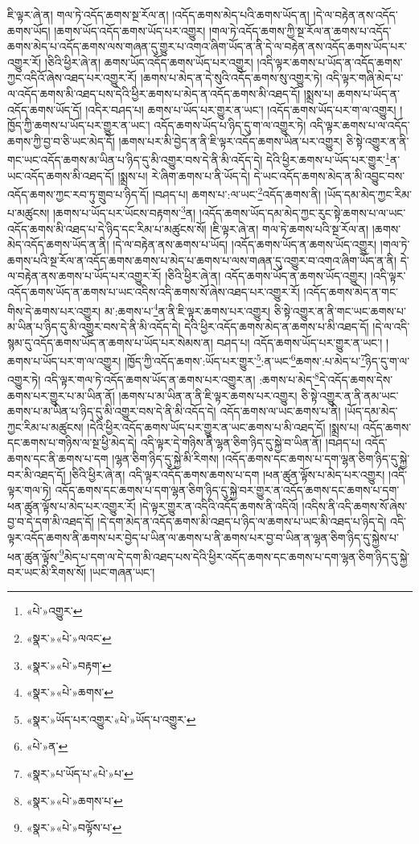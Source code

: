 ཇི་ལྟར་ཞེ་ན། གལ་ཏེ་འདོད་ཆགས་སྔ་རོལ་ན། །འདོད་ཆགས་མེད་པའི་ཆགས་ཡོད་ན། །དེ་ལ་བརྟེན་ནས་འདོད་ཆགས་ཡོད། །ཆགས་ཡོད་འདོད་ཆགས་ཡོད་པར་འགྱུར། །གལ་ཏེ་འདོད་ཆགས་ཀྱི་སྔ་རོལ་ན་ཆགས་པ་འདོད་ཆགས་མེད་པ་འདོད་ཆགས་ལས་གཞན་དུ་གྱུར་པ་འགའ་ཞིག་ཡོད་ན་ནི་དེ་ལ་བརྟེན་ནས་འདོད་ཆགས་ཡོད་པར་འགྱུར་རོ། །ཅིའི་ཕྱིར་ཞེ་ན། ཆགས་ཡོད་འདོད་ཆགས་ཡོད་པར་འགྱུར། །འདི་ལྟར་ཆགས་པ་ཡོད་ན་འདོད་ཆགས་ཀྱང་འདིའོ་ཞེས་འཐད་པར་འགྱུར་རོ། །ཆགས་པ་མེད་ན་དེ་སུའི་འདོད་ཆགས་སུ་འགྱུར་ཏེ། འདི་ལྟར་གཞི་མེད་པ་ལ་འདོད་ཆགས་མི་འཐད་པས་དེའི་ཕྱིར་ཆགས་པ་མེད་ན་འདོད་ཆགས་མི་འཐད་དོ། །སྨྲས་པ། ཆགས་པ་ཡོད་ན་འདོད་ཆགས་ཡོད་དོ། །འདིར་བཤད་པ། ཆགས་པ་ཡོད་པར་གྱུར་ན་ཡང་། །འདོད་ཆགས་ཡོད་པར་ག་ལ་འགྱུར། །ཁྱོད་ཀྱི་ཆགས་པ་ཡོད་པར་གྱུར་ན་ཡང་། འདོད་ཆགས་ཡོད་པ་ཉིད་དུ་ག་ལ་འགྱུར་ཏེ། འདི་ལྟར་ཆགས་པ་ལ་འདོད་ཆགས་ཀྱི་བྱ་བ་ཅི་ཡང་མེད་དོ། །ཆགས་པར་མི་བྱེད་ན་ནི་ཇི་ལྟར་འདོད་ཆགས་ཡིན་པར་འགྱུར། ཅི་སྟེ་འགྱུར་ན་ནི་གང་ཡང་འདོད་ཆགས་མ་ཡིན་པ་ཉིད་དུ་མི་འགྱུར་བས་དེ་ནི་མི་འདོད་དེ། དེའི་ཕྱིར་ཆགས་པ་ཡོད་པར་གྱུར་\footnote{«པེ་»འགྱུར་}ན་ཡང་འདོད་ཆགས་མི་འཐད་དོ། །སྨྲས་པ། རེ་ཞིག་ཆགས་པ་ནི་ཡོད་དེ། དེ་ཡང་འདོད་ཆགས་མེད་ན་མི་འབྱུང་བས་འདོད་ཆགས་ཀྱང་རབ་ཏུ་གྲུབ་པ་ཉིད་དོ། །བཤད་པ། ཆགས་པ་:ལ་ཡང་\footnote{«སྣར་»«པེ་»ལའང་}འདོད་ཆགས་ནི། །ཡོད་དམ་མེད་ཀྱང་རིམ་པ་མཚུངས། །ཆགས་པ་ཡོད་པར་ཡོངས་བརྟགས་\footnote{«སྣར་»«པེ་»བརྟག་}ན། །འདོད་ཆགས་ཡོད་དམ་མེད་ཀྱང་རུང་སྟེ་ཆགས་པ་ལ་ཡང་འདོད་ཆགས་མི་འཐད་པ་དེ་ཉིད་དང་རིམ་པ་མཚུངས་སོ། །ཇི་ལྟར་ཞེ་ན། གལ་ཏེ་ཆགས་པའི་སྔ་རོལ་ན། །ཆགས་མེད་འདོད་ཆགས་ཡོད་ན་ནི། །དེ་ལ་བརྟེན་ནས་ཆགས་པ་ཡོད། །འདོད་ཆགས་ཡོད་ན་ཆགས་ཡོད་འགྱུར། །གལ་ཏེ་ཆགས་པའི་སྔ་རོལ་ན་འདོད་ཆགས་ཆགས་པ་མེད་པ་ཆགས་པ་ལས་གཞན་དུ་འགྱུར་བ་འགའ་ཞིག་ཡོད་ན་ནི། དེ་ལ་བརྟེན་ནས་ཆགས་པ་ཡོད་པར་འགྱུར་རོ། །ཅིའི་ཕྱིར་ཞེ་ན། འདོད་ཆགས་ཡོད་ན་ཆགས་ཡོད་འགྱུར། །འདི་ལྟར་འདོད་ཆགས་ཡོད་ན་ཆགས་པ་ཡང་འདིས་འདི་ཆགས་སོ་ཞེས་འཐད་པར་འགྱུར་རོ། །འདོད་ཆགས་མེད་ན་གང་གིས་དེ་ཆགས་པར་འགྱུར། མ་:ཆགས་པ་\footnote{«སྣར་»«པེ་»ཆགས་}ན་ནི་ཇི་ལྟར་ཆགས་པར་འགྱུར། ཅི་སྟེ་འགྱུར་ན་ནི་གང་ཡང་ཆགས་པ་མ་ཡིན་པ་ཉིད་དུ་མི་འགྱུར་བས་དེ་ནི་མི་འདོད་དེ། དེའི་ཕྱིར་འདོད་ཆགས་མེད་ན་ཆགས་པ་མི་འཐད་དོ། །དེ་ལ་འདི་སྙམ་དུ་འདོད་ཆགས་ཡོད་ན་ཆགས་པ་ཡོད་པར་སེམས་ན། བཤད་པ། འདོད་ཆགས་ཡོད་པར་གྱུར་ན་ཡང་། །ཆགས་པ་ཡོད་པར་ག་ལ་འགྱུར། །ཁྱོད་ཀྱི་འདོད་ཆགས་:ཡོད་པར་གྱུར་\footnote{«སྣར་»ཡོད་པར་འགྱུར་«པེ་»ཡོད་པ་འགྱུར་}:ན་ཡང་\footnote{«པེ་»ན་}ཆགས་:པ་མེད་པ་\footnote{«སྣར་»པ་ཡོད་པ་«པེ་»པ་}ཉིད་དུ་ག་ལ་འགྱུར་ཏེ། འདི་ལྟར་གལ་ཏེ་འདོད་ཆགས་ཡོད་ན་ཆགས་པར་འགྱུར་ན། :ཆགས་པ་མེད་\footnote{«སྣར་»«པེ་»ཆགས་པ་}དེ་འདོད་ཆགས་དེས་ཆགས་པར་གྱུར་པ་མ་ཡིན་ནོ། །ཆགས་པ་མ་ཡིན་ན་ནི་ཇི་ལྟར་ཆགས་པར་འགྱུར། ཅི་སྟེ་འགྱུར་ན་ནི་ནམ་ཡང་ཆགས་པ་མ་ཡིན་པ་ཉིད་དུ་མི་འགྱུར་བས་དེ་ནི་མི་འདོད་དེ། འདོད་ཆགས་ལ་ཡང་ཆགས་པ་ནི། །ཡོད་དམ་མེད་ཀྱང་རིམ་པ་མཚུངས། །དེའི་ཕྱིར་འདོད་ཆགས་ཡོད་པར་གྱུར་ན་ཡང་ཆགས་པ་མི་འཐད་དོ། །སྨྲས་པ། འདོད་ཆགས་དང་ཆགས་པ་གཉིས་ལ་སྔ་ཕྱི་མེད་དེ། འདི་ལྟར་དེ་གཉིས་ནི་ལྷན་ཅིག་ཉིད་དུ་སྐྱེ་བ་ཡིན་ནོ། །བཤད་པ། འདོད་ཆགས་དང་ནི་ཆགས་པ་དག །ལྷན་ཅིག་ཉིད་དུ་སྐྱེ་མི་རིགས། །འདོད་ཆགས་དང་ཆགས་པ་དག་ལྷན་ཅིག་ཉིད་དུ་སྐྱེ་བར་མི་འཐད་དོ། །ཅིའི་ཕྱིར་ཞེ་ན། འདི་ལྟར་འདོད་ཆགས་ཆགས་པ་དག །ཕན་ཚུན་ལྟོས་པ་མེད་པར་འགྱུར། །འདི་ལྟར་གལ་ཏེ། འདོད་ཆགས་དང་ཆགས་པ་དག་ལྷན་ཅིག་ཉིད་དུ་སྐྱེ་བར་གྱུར་ན་འདོད་ཆགས་དང་ཆགས་པ་དག་ཕན་ཚུན་ལྟོས་པ་མེད་པར་འགྱུར་རོ། །དེ་ལྟར་གྱུར་ན་འདིའི་འདོད་ཆགས་ནི་འདིའོ། །འདིས་ནི་འདི་ཆགས་སོ་ཞེས་བྱ་བ་དེ་དག་མི་འཐད་དོ། །དེ་དག་མེད་ན་འདོད་ཆགས་མི་འཐད་པ་ཉིད་ལ་ཆགས་པ་ཡང་མི་འཐད་པ་ཉིད་དེ། འདི་ལྟར་འདོད་ཆགས་ནི་ཆགས་པར་བྱེད་པ་ཡིན་ལ་ཆགས་པ་ནི་ཆགས་པར་བྱ་བ་ཡིན་ན་ལྷན་ཅིག་ཉིད་དུ་སྐྱེས་པ་ཕན་ཚུན་ལྟོས་\footnote{«སྣར་»«པེ་»བལྟོས་པ་}མེད་པ་དག་ལ་དེ་དག་མི་འཐད་པས་དེའི་ཕྱིར་འདོད་ཆགས་དང་ཆགས་པ་དག་ལྷན་ཅིག་ཉིད་དུ་སྐྱེ་བར་ཡང་མི་རིགས་སོ། །ཡང་གཞན་ཡང་། 